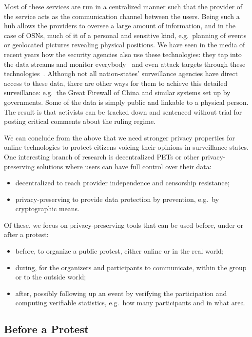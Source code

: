 \documentclass[a4paper]{llncs}
\begin{document}
Most of these services are run in a centralized manner such that the provider 
of the service acts as the communication channel between the users.
Being such a hub allows the providers to oversee a large amount of information, 
and in the case of \acp{OSN}, much of it of a personal and sensitive kind, 
e.g.\ planning of events or geolocated pictures revealing physical positions.
We have seen in the media of recent years how the security agencies also use 
these technologies: they tap into the data streams and monitor 
everybody~\cite{BoundlessInformant,XKeyscore} and even attack targets through 
these technologies~\cite{Quantum}.
Although not all nation-states' surveillance agencies have direct access to 
these data, there are other ways for them to achieve this detailed 
surveillance: e.g.\ the Great Firewall of China and similar systems set up by 
governments.
Some of the data is simply public and linkable to a physical person.
The result is that activists can be tracked down and sentenced without trial 
for posting critical comments about the ruling regime.

We can conclude from the above that we need stronger privacy properties for 
online technologies to protect citizens voicing their opinions in surveillance 
states.
One interesting branch of research is decentralized \acp{PET} or other 
privacy-preserving solutions where users can have full control over their data:
\begin{itemize}
  \item decentralized to reach provider independence and censorship resistance;
  \item privacy-preserving to provide data protection by prevention, e.g.\ by 
    cryptographic means.
\end{itemize}
Of these, we focus on privacy-preserving tools that can be used before, under 
or after a protest:
\begin{itemize}
  \item before, to organize a public protest, either online or in the real 
    world;
  \item during, for the organizers and participants to communicate, within 
    the group or to the outside world;
  \item after, possibly following up an event by verifying the participation 
    and computing verifiable statistics, e.g.\ how many participants and in 
    what area.
\end{itemize}


\subsection{Before a Protest}
\end{document}
